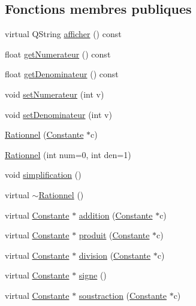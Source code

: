 \subsection*{\-Fonctions membres publiques}
\begin{DoxyCompactItemize}
\item 
virtual \-Q\-String \hyperlink{class_rationnel_aef5b4fb13f34b03cdf9132c272b5144f}{afficher} () const 
\item 
float \hyperlink{class_rationnel_a5802a9dda12b8af3ffef1eae3ee23d4a}{get\-Numerateur} () const 
\item 
float \hyperlink{class_rationnel_ae2a533befbdf1ec3977d36cd792af2ea}{get\-Denominateur} () const 
\item 
void \hyperlink{class_rationnel_ae96e448dcef2ceade17d42ddc58076bf}{set\-Numerateur} (int v)
\item 
void \hyperlink{class_rationnel_a09af735e39194e35ca2bfbaa6f8eb0b9}{set\-Denominateur} (int v)
\item 
\hyperlink{class_rationnel_a7e09e73d23a43aeb59086cabcd87381a}{\-Rationnel} (\hyperlink{class_constante}{\-Constante} $\ast$c)
\item 
\hyperlink{class_rationnel_abfbb081364b14280bd0dad5c446078d5}{\-Rationnel} (int num=0, int den=1)
\item 
void \hyperlink{class_rationnel_a90d440a5d909748f5fda471e027e3a85}{simplification} ()
\item 
virtual \hyperlink{class_rationnel_a6710cf28d22bb53fda5474059877c2cd}{$\sim$\-Rationnel} ()
\item 
virtual \hyperlink{class_constante}{\-Constante} $\ast$ \hyperlink{class_rationnel_a4dc6b238834ace05451e69ea2bb6d02a}{addition} (\hyperlink{class_constante}{\-Constante} $\ast$c)
\item 
virtual \hyperlink{class_constante}{\-Constante} $\ast$ \hyperlink{class_rationnel_aa1a21dae65f5fb48c56a376aea420bd6}{produit} (\hyperlink{class_constante}{\-Constante} $\ast$c)
\item 
virtual \hyperlink{class_constante}{\-Constante} $\ast$ \hyperlink{class_rationnel_acf6c7167cfd8005ac723ce11feae2845}{division} (\hyperlink{class_constante}{\-Constante} $\ast$c)
\item 
virtual \hyperlink{class_constante}{\-Constante} $\ast$ \hyperlink{class_rationnel_a12ba8bcf6c200e85c4d260ee0bbb78b6}{signe} ()
\item 
virtual \hyperlink{class_constante}{\-Constante} $\ast$ \hyperlink{class_rationnel_a268c0a861cdacea0593774b50a346a98}{soustraction} (\hyperlink{class_constante}{\-Constante} $\ast$c)

\end{DoxyCompactItemize}
